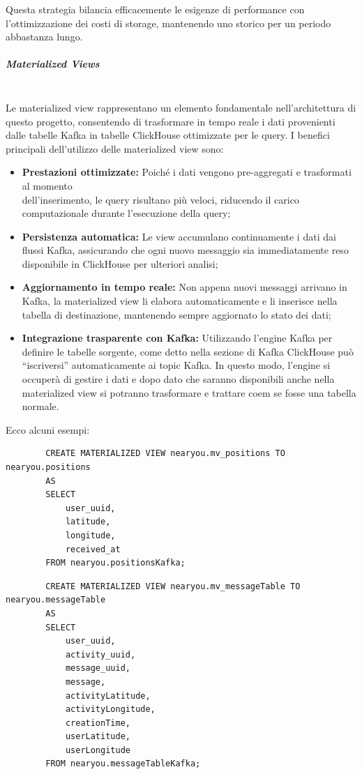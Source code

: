 \documentclass[10pt]{article}
\newcommand{\mysubparagraph}[1]{\subparagraph{#1}\mbox{}\\}
\begin{document}
        Questa strategia bilancia efficacemente le esigenze di performance con l'ottimizzazione dei costi di storage, mantenendo uno storico per un periodo abbastanza lungo.

        \mysubparagraph{Materialized Views}
        Le materialized view rappresentano un elemento fondamentale nell'architettura di questo progetto, consentendo di trasformare in tempo reale i dati provenienti dalle tabelle Kafka in tabelle ClickHouse ottimizzate per le query. I benefici principali dell'utilizzo delle materialized view sono:
        \begin{itemize}
            \item \textbf{Prestazioni ottimizzate:} Poiché i dati vengono pre-aggregati e trasformati al momento\\ dell'inserimento, le query risultano più veloci, riducendo il carico computazionale durante l'esecuzione della query;
            \item \textbf{Persistenza automatica:} Le view accumulano continuamente i dati dai flussi Kafka, assicurando che ogni nuovo messaggio sia immediatamente reso disponibile in ClickHouse per ulteriori analisi;
            \item \textbf{Aggiornamento in tempo reale:} Non appena nuovi messaggi arrivano in Kafka, la materialized view li elabora automaticamente e li inserisce nella tabella di destinazione, mantenendo sempre aggiornato lo stato dei dati;
            \item \textbf{Integrazione trasparente con Kafka:} Utilizzando l'engine Kafka per definire le tabelle sorgente, come detto nella sezione di Kafka ClickHouse può “iscriversi” automaticamente ai topic Kafka. In questo modo, l'engine si occuperà di gestire i dati e dopo dato che saranno disponibili anche nella materialized view si potranno trasformare e trattare coem se fosse una tabella normale.
        \end{itemize}
        
        Ecco alcuni esempi:

        \begin{lstlisting}
        CREATE MATERIALIZED VIEW nearyou.mv_positions TO nearyou.positions
        AS
        SELECT
            user_uuid,
            latitude,
            longitude,
            received_at
        FROM nearyou.positionsKafka;
        \end{lstlisting}

        \begin{lstlisting}
        CREATE MATERIALIZED VIEW nearyou.mv_messageTable TO nearyou.messageTable
        AS
        SELECT
            user_uuid,
            activity_uuid,
            message_uuid,
            message,
            activityLatitude,
            activityLongitude,
            creationTime,
            userLatitude,
            userLongitude
        FROM nearyou.messageTableKafka;
        \end{lstlisting}
\end{document}
